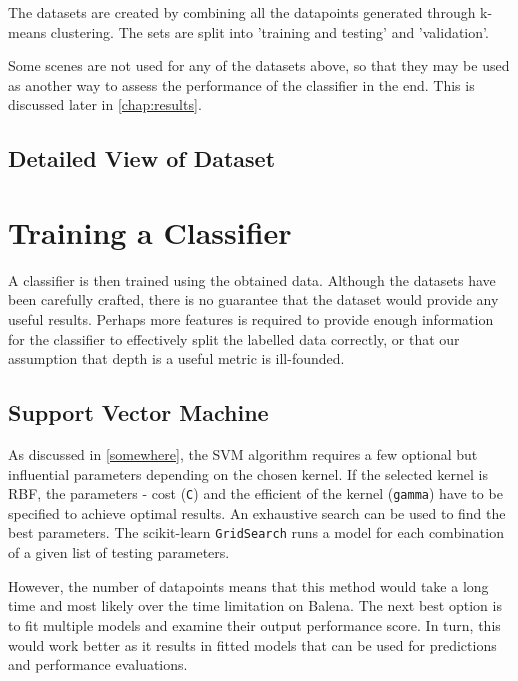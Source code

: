 \documentclass[dissertation.tex]{subfiles}
\begin{document}
The datasets are created by combining all the datapoints generated through k-means clustering. The sets are split into 'training and testing' and 'validation'.

Some scenes are not used for any of the datasets above, so that they may be used as another way to assess the performance of the classifier in the end. This is discussed later in \autoref{chap:results}.

\subsection{Detailed View of Dataset}


\section{Training a Classifier}
A classifier is then trained using the obtained data. Although the datasets have been carefully crafted, there is no guarantee that the dataset would provide any useful results. Perhaps more features is required to provide enough information for the classifier to effectively split the labelled data correctly, or that our assumption that depth is a useful metric is ill-founded.

\subsection{Support Vector Machine}
As discussed in \ref{somewhere}, the SVM algorithm requires a few optional but influential parameters depending on the chosen kernel. If the selected kernel is RBF, the parameters - cost (\texttt{C}) and the efficient of the kernel (\texttt{gamma}) have to be specified to achieve optimal results. An exhaustive search can be used to find the best parameters. The scikit-learn \texttt{GridSearch} runs a model for each combination of a given list of testing parameters. 

However, the number of datapoints means that this method would take a long time and most likely over the time limitation on Balena. The next best option is to fit multiple models and examine their output performance score. In turn, this would work better as it results in fitted models that can be used for predictions and performance evaluations.

\end{document}
